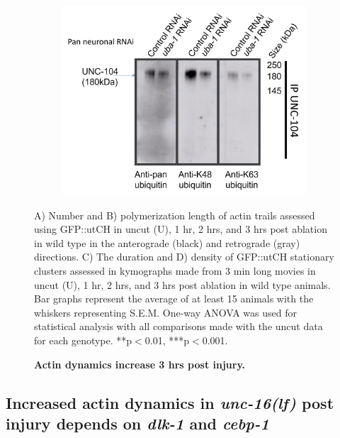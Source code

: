 \begin{appendices}
\begin{figure}[H]
\begin{subfigure}{0.45\textwidth}
		\end{subfigure}
		\begin{subfigure}{0.45\textwidth}
			\caption{}
			\includegraphics[width=\textwidth]{figs/example}
			
		\end{subfigure}
		
		\caption[Actin dynamics increase 3 hrs post injury.]{\textbf{Actin dynamics increase 3 hrs post injury.}} \raggedright \small A) Number and B) polymerization length of actin trails assessed using GFP::utCH in uncut (U), 1 hr, 2 hrs, and 3 hrs post ablation in wild type in the anterograde (black) and retrograde (gray) directions. C) The duration and D) density of GFP::utCH stationary clusters assessed in kymographs made from 3 min long movies in uncut (U), 1 hr, 2 hrs, and 3 hrs post ablation in wild type animals. Bar graphs represent the average of at least 15 animals with the whiskers representing S.E.M. One-way ANOVA was used for statistical analysis with all comparisons made with the uncut data for each genotype. **p$<$0.01, ***p$<$0.001.
		\label{fig:Actdyntime}
	\end{figure}
	
	\subsection{Increased actin dynamics in \textit{unc-16(lf)} post injury depends on \textit{dlk-1} and \textit{cebp-1}}
	

\end{appendices}
